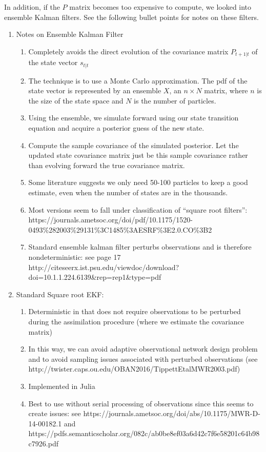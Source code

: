 \documentclass[12 pt, oneside]{article}
\theoremstyle{definition}
\theoremstyle{definition}
\theoremstyle{definition}
\begin{document}
In addition, if the $P$ matrix becomes too expensive to compute, we looked into ensemble Kalman filters. See the following bullet points for notes on these filters.
\begin{enumerate}
\item Notes on Ensemble Kalman Filter
\begin{enumerate}
\item Completely avoids the direct evolution of the covariance matrix $P_{t+1|t}$ of the state vector $s_{t|t}$
\item The technique is to use a Monte Carlo approximation. The pdf of the state vector is represented by an ensemble $X$, an $n\times N$ matrix, where $n$ is the size of the state space and $N$ is the number of particles.
\item Using the ensemble, we simulate forward using our state transition equation and acquire a posterior guess of the new state.
\item Compute the sample covariance of the simulated posterior. Let the updated state covariance matrix just be this sample covariance rather than evolving
forward the true covariance matrix.
\item Some literature suggests
 we only need 50-100 particles to keep a good estimate, even when the number of states are in the thousands.
\item Most versions seem to fall under classification of ``square root filters'': https://journals.ametsoc.org/doi/pdf/10.1175/1520-0493\%282003\%29131\%3C1485\%3AESRF\%3E2.0.CO\%3B2
\item Standard ensemble kalman filter perturbs observations and is therefore nondeterministic: see page 17 http://citeseerx.ist.psu.edu/viewdoc/download?doi=10.1.1.224.6139\&rep=rep1\&type=pdf
\end{enumerate}
\item Standard Square root EKF:
\begin{enumerate}
\item Deterministic in that does not require observations to be perturbed during the assimilation procedure (where we estimate the covariance matrix)
\item In this way, we can avoid adaptive observational network design problem and to avoid sampling issues associated with perturbed observations (see http://twister.caps.ou.edu/OBAN2016/TippettEtalMWR2003.pdf)
\item Implemented in Julia
\item Best to use without serial processing of observations since this seems to create issues: see https://journals.ametsoc.org/doi/abs/10.1175/MWR-D-14-00182.1 and https://pdfs.semanticscholar.org/082c/ab0be8ef03a6d42c7f6e58201c64b98c7926.pdf

\end{enumerate}
\end{enumerate}
\end{document}
